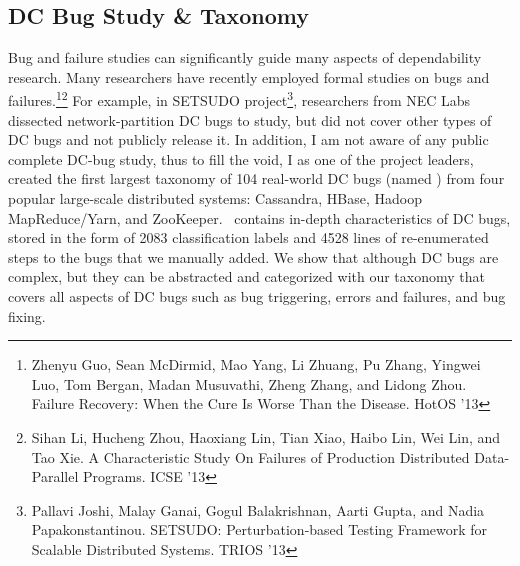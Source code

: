 \documentclass[10pt]{article}
\begin{document}
\subsection{DC Bug Study \& Taxonomy} 

Bug and failure studies can significantly guide many aspects of dependability
research. Many researchers have recently employed formal studies on bugs and
failures.\footnote{Zhenyu Guo, Sean McDirmid, Mao Yang, Li Zhuang, Pu Zhang,
Yingwei Luo, Tom Bergan, Madan Musuvathi, Zheng Zhang, and Lidong Zhou. Failure
Recovery: When the Cure Is Worse Than the Disease. HotOS '13}\footnote{Sihan Li,
Hucheng Zhou, Haoxiang Lin, Tian Xiao, Haibo Lin, Wei Lin, and Tao Xie. A
Characteristic Study On Failures of Production Distributed Data-Parallel
Programs. ICSE '13}
%
For example, in SETSUDO project\footnote{Pallavi Joshi, Malay Ganai, Gogul
Balakrishnan, Aarti Gupta, and Nadia Papakonstantinou. SETSUDO:
Perturbation-based Testing Framework for Scalable Distributed Systems. TRIOS
'13}, researchers from NEC Labs dissected network-partition DC bugs to study,
but did not cover other types of DC bugs and not publicly release it.
%
In addition, I am not aware of any public complete DC-bug study, thus to fill
the void, I as one of the project leaders, created the first largest taxonomy
of 104 real-world DC bugs (named \taxdc) \cite{Leesatapornwongsa+16-TaxDC} from
four popular large-scale distributed systems: Cassandra, HBase, Hadoop
MapReduce/Yarn, and ZooKeeper.  \taxdc\ contains in-depth characteristics of DC
bugs, stored in the form of 2083 classification labels and 4528 lines of
re-enumerated steps to the bugs that we manually added. We show that although
DC bugs are complex, but they can be abstracted and categorized with our
taxonomy that covers all aspects of DC bugs such as bug triggering, errors and
failures, and bug fixing.


%
\end{document}
